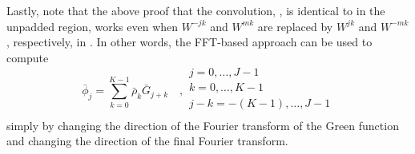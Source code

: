 

Lastly, note that the above proof that the convolution,  , is identical to  in the unpadded region, works even when
$W^{-j k}$ and $W^{m k}$  are replaced by $W^{j k}$ and $W^{-m k}$, respectively, in . In other words, the FFT-based approach can be used to compute
\begin{equation}
\bar{\phi}_j=\sum_{k=0}^{K-1}\bar{\rho}_k \bar{G}_{j+k}\quad,
\begin{array}{l}
j=0,\ldots,J-1 \\
k=0,\ldots,K-1 \\
j-k=-(K-1),\ldots,J-1 \\
\end{array}
\label{eq:bruteforcecorrelation}
\end{equation}
simply by changing the direction of the Fourier transform of the Green function and changing the direction of the final Fourier transform.

